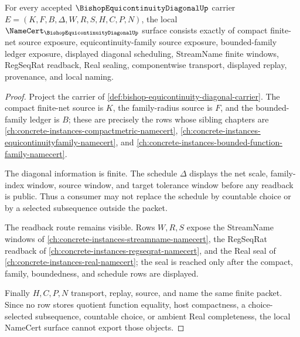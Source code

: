 \begin{theorem}
\label{thm:bishop-equicontinuity-diagonal-namecert-obligations}
For every accepted $\BishopEquicontinuityDiagonalUp$ carrier $E=(K,F,B,\Delta,W,R,S,H,C,P,N)$, the local $\NameCert_{\BishopEquicontinuityDiagonalUp}$ surface consists exactly of compact finite-net source exposure, equicontinuity-family source exposure, bounded-family ledger exposure, displayed diagonal scheduling, StreamName finite windows, RegSeqRat readback, Real sealing, componentwise transport, displayed replay, provenance, and local naming.
\end{theorem}
\begin{proof}
Project the carrier of \autoref{def:bishop-equicontinuity-diagonal-carrier}. The compact finite-net source is $K$, the family-radius source is $F$, and the bounded-family ledger is $B$; these are precisely the rows whose sibling chapters are \autoref{ch:concrete-instances-compactmetric-namecert}, \autoref{ch:concrete-instances-equicontinuityfamily-namecert}, and \autoref{ch:concrete-instances-bounded-function-family-namecert}.

The diagonal information is finite. The schedule $\Delta$ displays the net scale, family-index window, source window, and target tolerance window before any readback is public. Thus a consumer may not replace the schedule by countable choice or by a selected subsequence outside the packet.

The readback route remains visible. Rows $W,R,S$ expose the StreamName windows of \autoref{ch:concrete-instances-streamname-namecert}, the RegSeqRat readback of \autoref{ch:concrete-instances-regseqrat-namecert}, and the Real seal of \autoref{ch:concrete-instances-real-namecert}; the seal is reached only after the compact, family, boundedness, and schedule rows are displayed.

Finally $H,C,P,N$ transport, replay, source, and name the same finite packet. Since no row stores quotient function equality, host compactness, a choice-selected subsequence, countable choice, or ambient Real completeness, the local NameCert surface cannot export those objects.
\end{proof}

